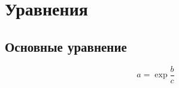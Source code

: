 \chapter{Уравнения}\label{ch:equations}

\section*{Основные уравнение}

\begin{equation}
  a = \exp{\frac{b}{c}}
\end{equation}